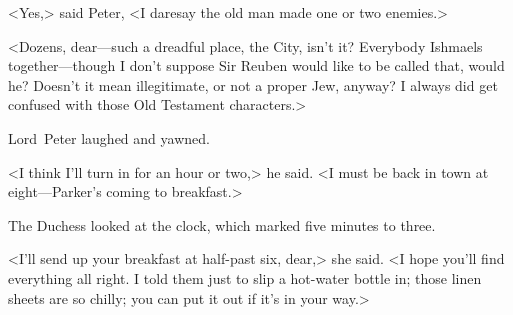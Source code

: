 <Yes,> said Peter, <I daresay the old man made one or two enemies.>

<Dozens, dear—such a dreadful place, the City, isn't it? Everybody Ishmaels together—though I don't suppose Sir Reuben would like to be called that, would he? Doesn't it mean illegitimate, or not a proper Jew, anyway? I always did get confused with those Old Testament characters.>

Lord~Peter laughed and yawned.

<I think I'll turn in for an hour or two,> he said. <I must be back in town at eight—Parker's coming to breakfast.>

The Duchess looked at the clock, which marked five minutes to three.

<I'll send up your breakfast at half-past six, dear,> she said. <I hope you'll find everything all right. I told them just to slip a hot-water bottle in; those linen sheets are so chilly; you can put it out if it's in your way.>

